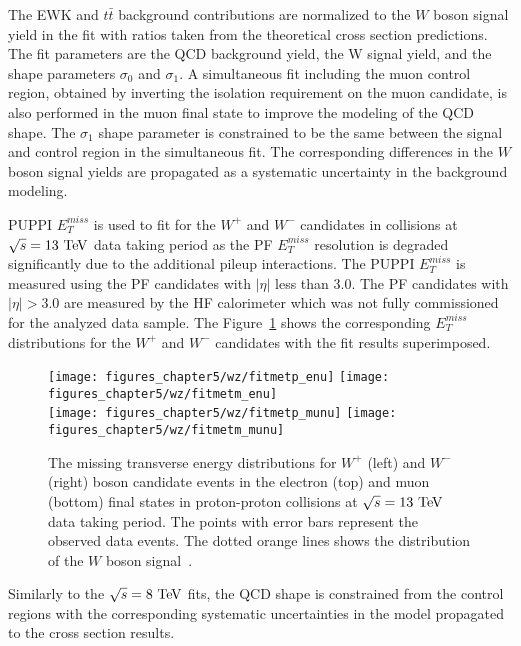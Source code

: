The EWK and $t\bar{t}$ background contributions are normalized to the $W$ boson signal yield in the fit with ratios taken from the theoretical cross section predictions. The fit parameters are the QCD background yield, the W signal yield, and the shape parameters $\sigma_0$ and $\sigma_1$. A simultaneous fit including the muon control region, obtained by inverting the isolation requirement on the muon candidate, is also performed in the muon final state to improve the modeling of the QCD shape. The $\sigma_1$ shape parameter is constrained to be the same between the signal and control region in the simultaneous fit. The corresponding differences in the $W$ boson signal yields are propagated as a systematic uncertainty in the background modeling.    
 
PUPPI $E_{T}^{miss}$ is used to fit for the $W^{+}$ and $W^{-}$ candidates in collisions at $\sqrt{s}=13~\mathrm{Te\kern -0.1em V}$ data taking period as the PF $E_{T}^{miss}$ resolution is degraded significantly due to the additional pileup interactions. The PUPPI $E_{T}^{miss}$ is measured using the PF candidates with $|\eta|$ less than $3.0$. The PF candidates with $|\eta|>3.0$ are measured by the HF calorimeter which was not fully commissioned for the analyzed data sample. The Figure~\ref{fig:W13} shows the corresponding $E_{T}^{miss}$ distributions for the $W^{+}$ and $W^{-}$ candidates with the fit results superimposed.
\begin{figure}[htbp]
\centering
\texttt{[image: figures\_chapter5/wz/fitmetp\_enu]}
\texttt{[image: figures\_chapter5/wz/fitmetm\_enu]}\\
\texttt{[image: figures\_chapter5/wz/fitmetp\_munu]}
\texttt{[image: figures\_chapter5/wz/fitmetm\_munu]}
\caption{The missing transverse energy distributions for $W^+$  (left) and $W^-$  (right) boson candidate events in the electron (top) and muon (bottom) final states in proton-proton collisions at $\sqrt{s}=13~\mathrm{Te\kern -0.1em V}$ data taking period. The points with error bars represent the observed data events. The dotted orange lines shows the distribution of the $W$ boson signal~\cite{CMS-PAS-SMP-15-004}. 
\label{fig:W13}}
\end{figure}
Similarly to the $\sqrt{s}=8~\mathrm{Te\kern -0.1em V}$ fits, the QCD shape is constrained from the control regions with the corresponding systematic uncertainties in the model propagated to the cross section results. 

